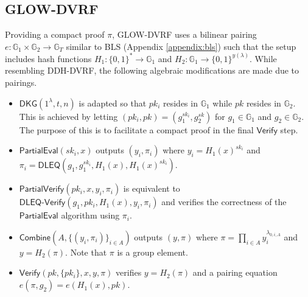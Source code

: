 \documentclass[conference]{IEEEtran}
\theoremstyle{definition}
\theoremstyle{remark}
\begin{document}
\subsection{GLOW-DVRF}
\label{appendix:glow-dvrf}
Providing a compact proof $\pi$, GLOW-DVRF uses a bilinear pairing $e: \mathbb{G}_1 \times \mathbb{G}_2 \rightarrow \mathbb{G}_T$ similar to BLS (Appendix \ref{appendix:bls}) such that the setup includes hash functions $H_1: \{0, 1\}^* \rightarrow \mathbb{G}_1$ and $H_2: \mathbb{G}_1 \rightarrow \{0, 1\}^{y(\lambda)}$. While resembling DDH-DVRF, the following algebraic modifications are made due to pairings.
\begin{itemize}
\item $\mathsf{DKG}(1^\lambda, t, n)$ is adapted so that $pk_i$ resides in $\mathbb{G}_1$ while $pk$ resides in $\mathbb{G}_2$. This is achieved by letting $(pk_i, pk) = (g_1^{sk_i}, g_2^{sk})$ for $g_1 \in \mathbb{G}_1$ and $g_2 \in \mathbb{G}_2$. The purpose of this is to facilitate a compact proof in the final $\mathsf{Verify}$ step.
\item $\mathsf{PartialEval}(sk_i, x)$ outputs $(y_i, \pi_i)$ where $y_i = H_1(x)^{sk_i}$ and $\pi_i = \mathsf{DLEQ}(g_1, g_1^{sk_i}, H_1(x), H_1(x)^{sk_i})$.
\item $\mathsf{PartialVerify}(pk_i, x, y_i, \pi_i)$ is equivalent to $\mathsf{DLEQ}\text{-}\mathsf{Verify}(g_1, pk_i, H_1(x), y_i, \pi_i)$ and verifies the correctness of the $\mathsf{PartialEval}$ algorithm using $\pi_i$.
\item $\mathsf{Combine}(A, \{(y_i, \pi_i)\}_{i \in A})$ outputs $(y, \pi)$ where $\pi = \prod_{i \in A} y_i^{\lambda_{0, i, A}}$ and $y = H_2(\pi)$. Note that $\pi$ is a group element.
\item $\mathsf{Verify}(pk, \{pk_i\}, x, y, \pi)$ verifies $y = H_2(\pi)$ and a pairing equation $e(\pi, g_2) = e(H_1(x), pk)$.
\end{itemize}
\end{document}
